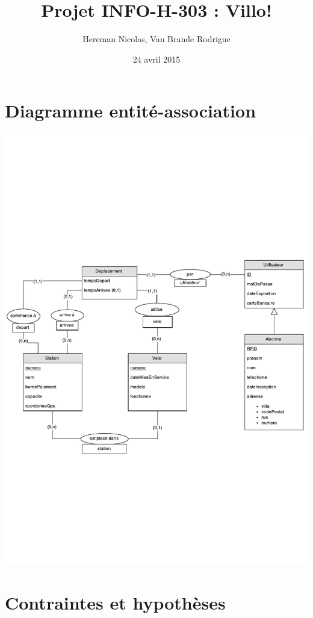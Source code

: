 \documentclass[a4paper, 12pt]{report}
\title{Projet INFO-H-303 : Villo!}
\author{Hereman Nicolas, Van Brande Rodrigue}
\date{24 avril 2015}
\begin{document}
\maketitle 

\section*{Diagramme entité-association} %
	\includegraphics[scale=0.9]{entityassocdiagram.pdf}

\section*{Contraintes et hypothèses} %
\end{document}

